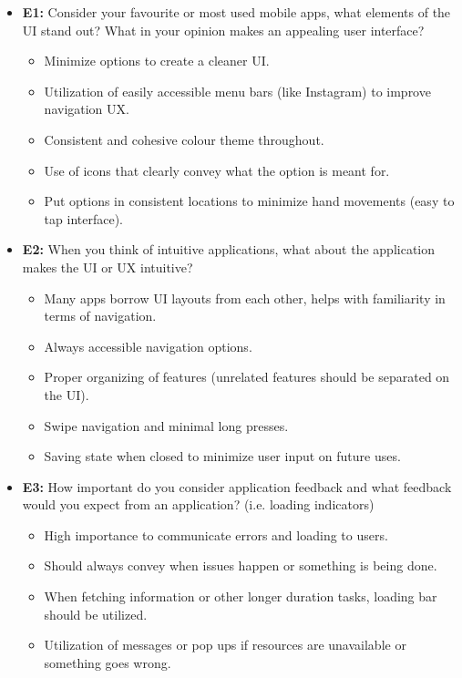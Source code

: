 \documentclass[12pt]{article}
\begin{document}
\begin{itemize}
  \item \textbf{E1:} Consider your favourite or most used mobile apps, what elements of the UI
  stand out? What in your opinion makes an appealing user interface?
    \begin{itemize}
      \item Minimize options to create a cleaner UI.
      \item Utilization of easily accessible menu bars (like Instagram) to improve navigation UX.
      \item Consistent and cohesive colour theme throughout.
      \item Use of icons that clearly convey what the option is meant for.
      \item Put options in consistent locations to minimize hand movements (easy to tap interface).
    \end{itemize}
  \item \textbf{E2:} When you think of intuitive applications, what about the application makes
  the UI or UX intuitive?
    \begin{itemize}
      \item Many apps borrow UI layouts from each other, helps with familiarity in terms of navigation.
      \item Always accessible navigation options.
      \item Proper organizing of features (unrelated features should be separated on the UI).
      \item Swipe navigation and minimal long presses.
      \item Saving state when closed to minimize user input on future uses.
    \end{itemize}
  \item \textbf{E3:} How important do you consider application feedback and what feedback would you
  expect from an application? (i.e. loading indicators)
    \begin{itemize}
      \item High importance to communicate errors and loading to users.
      \item Should always convey when issues happen or something is being done.
      \item When fetching information or other longer duration tasks, loading bar should be utilized.
      \item Utilization of messages or pop ups if resources are unavailable or something goes wrong.
    \end{itemize}

\end{itemize}
\end{document}
